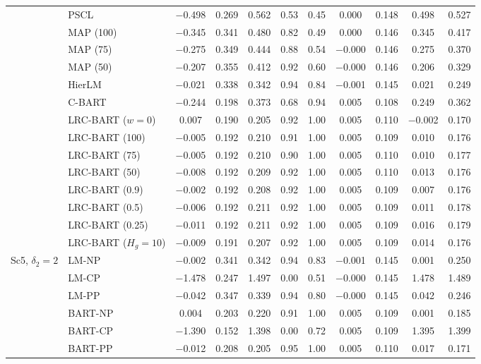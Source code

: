 \documentclass[11pt]{article}
\theoremstyle{definition}
\theoremstyle{plain}
\begin{document}
\begin{center}
\begin{longtable}{llccccccccc}
& PSCL & $-$0.498 & 0.269 & 0.562 & 0.53 & 0.45 & 0.000 & 0.148 & 0.498 & 0.527 \\
& MAP (100) & $-$0.345 & 0.341 & 0.480 & 0.82 & 0.49 & 0.000 & 0.146 & 0.345 & 0.417 \\
& MAP (75) & $-$0.275 & 0.349 & 0.444 & 0.88 & 0.54 & $-$0.000 & 0.146 & 0.275 & 0.370 \\
& MAP (50) & $-$0.207 & 0.355 & 0.412 & 0.92 & 0.60 & $-$0.000 & 0.146 & 0.206 & 0.329 \\
& HierLM & $-$0.021 & 0.338 & 0.342 & 0.94 & 0.84 & $-$0.001 & 0.145 & 0.021 & 0.249 \\
& C-BART & $-$0.244 & 0.198 & 0.373 & 0.68 & 0.94 & 0.005 & 0.108 & 0.249 & 0.362 \\
& LRC-BART ($w=0$) & 0.007 & 0.190 & 0.205 & 0.92 & 1.00 & 0.005 & 0.110 & $-$0.002 & 0.170 \\
& LRC-BART (100) & $-$0.005 & 0.192 & 0.210 & 0.91 & 1.00 & 0.005 & 0.109 & 0.010 & 0.176 \\
& LRC-BART (75) & $-$0.005 & 0.192 & 0.210 & 0.90 & 1.00 & 0.005 & 0.110 & 0.010 & 0.177 \\
& LRC-BART (50) & $-$0.008 & 0.192 & 0.209 & 0.92 & 1.00 & 0.005 & 0.110 & 0.013 & 0.176 \\
& LRC-BART (0.9) & $-$0.002 & 0.192 & 0.208 & 0.92 & 1.00 & 0.005 & 0.109 & 0.007 & 0.176 \\
& LRC-BART (0.5) & $-$0.006 & 0.192 & 0.211 & 0.92 & 1.00 & 0.005 & 0.109 & 0.011 & 0.178 \\
& LRC-BART (0.25) & $-$0.011 & 0.192 & 0.211 & 0.92 & 1.00 & 0.005 & 0.109 & 0.016 & 0.179 \\
& LRC-BART ($H_g=10$) & $-$0.009 & 0.191 & 0.207 & 0.92 & 1.00 & 0.005 & 0.109 & 0.014 & 0.176 \\
\midrule
\multirow{20}{*}{Sc5, $\delta_2=2$} & LM-NP & $-$0.002 & 0.341 & 0.342 & 0.94 & 0.83 & $-$0.001 & 0.145 & 0.001 & 0.250 \\
& LM-CP & $-$1.478 & 0.247 & 1.497 & 0.00 & 0.51 & $-$0.000 & 0.145 & 1.478 & 1.489 \\
& LM-PP & $-$0.042 & 0.347 & 0.339 & 0.94 & 0.80 & $-$0.000 & 0.145 & 0.042 & 0.246 \\
& BART-NP & 0.004 & 0.203 & 0.220 & 0.91 & 1.00 & 0.005 & 0.109 & 0.001 & 0.185 \\
& BART-CP & $-$1.390 & 0.152 & 1.398 & 0.00 & 0.72 & 0.005 & 0.109 & 1.395 & 1.399 \\
& BART-PP & $-$0.012 & 0.208 & 0.205 & 0.95 & 1.00 & 0.005 & 0.110 & 0.017 & 0.171 \\

\end{longtable}
\end{center}
\end{document}
